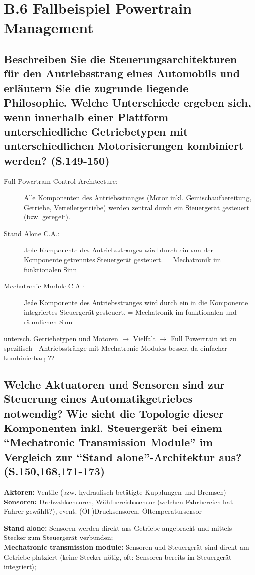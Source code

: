 \section*{B.6 Fallbeispiel Powertrain Management}

\subsection{Beschreiben Sie die Steuerungsarchitekturen f\"ur den Antriebsstrang eines Automobils und erl\"autern Sie die zugrunde liegende Philosophie. Welche Unterschiede ergeben sich, wenn innerhalb einer Plattform unterschiedliche Getriebetypen mit unterschiedlichen Motorisierungen kombiniert werden? (S.149-150)}
\begin{description}
\item[Full Powertrain Control Architecture:] Alle Komponenten des Antriebsstranges (Motor inkl. 
  Gemischaufbereitung, Getriebe, Verteilergetriebe) werden zentral durch ein Steuergerät 
  gesteuert (bzw. geregelt).
\item[Stand Alone C.A.:] Jede Komponente des Antriebsstranges wird durch ein von der Komponente
  getrenntes Steuergerät gesteuert. = Mechatronik im funktionalen Sinn
\item[Mechatronic Module C.A.:] Jede Komponente des Antriebsstranges wird durch ein in die 
  Komponente integriertes Steuergerät gesteuert. = Mechatronik im funktionalen und räumlichen Sinn
\end{description}
untersch. Getriebetypen und Motoren $\rightarrow$ Vielfalt $\rightarrow$ Full Powertrain ist 
zu spezifisch - Antriebsstränge mit Mechatronic Modules besser, da einfacher 
kombinierbar; ??

\subsection{Welche Aktuatoren und Sensoren sind zur Steuerung eines Automatikgetriebes notwendig? Wie sieht die Topologie dieser Komponenten inkl. Steuerger\"at bei einem ``Mechatronic Transmission Module'' im Vergleich zur ``Stand alone''-Architektur aus? (S.150,168,171-173)}
{\bf Aktoren:} Ventile (bzw. hydraulisch betätigte Kupplungen und Bremsen) \\
{\bf Sensoren:} Drehzahlsensoren, Wählbereichssensor (welchen Fahrbereich hat Fahrer gewählt?), 
event. (Öl-)Drucksensoren, Öltemperatursensor

{\bf Stand alone:} Sensoren werden direkt ans Getriebe angebracht und mittels Stecker zum 
Steuergerät verbunden; \\
{\bf Mechatronic transmission module:} Sensoren und Steuergerät sind direkt am Getriebe platziert
(keine Stecker nötig, oft: Sensoren bereits im Steuergerät integriert);

